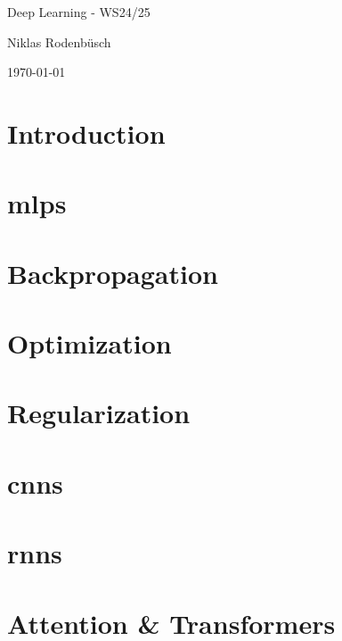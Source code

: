 \documentclass[a4paper,11pt]{article}
\begin{document}


\begin{center}
    {\huge Deep Learning - WS24/25 \par}
    \vspace{0.5cm}
    {\large Niklas Rodenbüsch \par}
    \vspace{0.5cm}
    {\large \today \par}
\end{center}
\vspace{0.5cm}

\section{Introduction}


\section{\acp{mlp}}


\section{Backpropagation}


\section{Optimization}


\section{Regularization}


\section{\acp{cnn}}


\section{\acp{rnn}}


\section{Attention \& Transformers}

\end{document}
